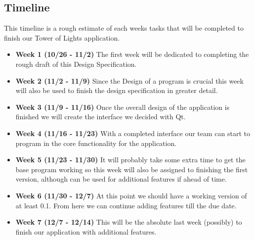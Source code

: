 \documentclass{article}
\begin{document}
\subsection{Timeline}
This timeline is a rough estimate of each weeks tasks that will be completed to finish our Tower of Lights application. 
	\begin{itemize}
		\item \textbf{Week 1 (10/26 - 11/2)} The first week will be dedicated to completing the rough draft of this Design Specification. 
		\item \textbf{Week 2 (11/2 - 11/9)} Since the Design of a program is crucial this week will also be used to finish the design specification in greater detail.
		\item \textbf{Week 3 (11/9 - 11/16)} Once the overall design of the application is finished we will create the interface we decided with Qt.
		\item \textbf{Week 4 (11/16 - 11/23)} With a completed interface our team can start to program in the core functionality for the application.
		\item \textbf{Week 5 (11/23 - 11/30)} It will probably take some extra time to get the base program working so this week will also be assigned to finishing the first version, although 				can be used for additional features if ahead of time.
		\item \textbf{Week 6 (11/30 - 12/7)} At this point we should have a working version of at least 0.1. From here we can continue adding features till the due date.
		\item \textbf{Week 7 (12/7 - 12/14)} This will be the absolute last week (possibly) to finish our application with additional features.
	\end{itemize}
\end{document}
